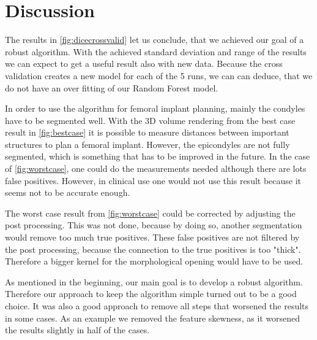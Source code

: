 \section{Discussion}
The results in \autoref{fig:dicecrossvalid} let us conclude, that we achieved our goal of a robust algorithm. With the achieved standard deviation and range of the results we can expect to get a useful result also with new data. Because the cross validation creates a new model for each of the 5 runs, we can can deduce, that we do not have an over fitting of our Random Forest model. 

In order to use the algorithm for femoral implant planning, mainly the condyles have to be segmented well. With the 3D volume rendering from the best case result in \autoref{fig:bestcase} it is possible to measure distances between important structures to plan a femoral implant. However, the epicondyles are not fully segmented, which is something that has to be improved in the future. In the case of \autoref{fig:worstcase}, one could do the measurements needed although there are lots false positives. However, in clinical use one would not use this result because it seems not to be accurate enough.

The worst case result from \autoref{fig:worstcase} could be corrected by adjusting the post processing. This was not done, because by doing so, another segmentation would remove too much true positives. These false positives are not filtered by the post processing, because the connection to the true positives is too "thick". Therefore a bigger kernel for the morphological opening would have to be used.

As mentioned in the beginning, our main goal is to develop a robust algorithm. Therefore our approach to keep the algorithm simple turned out to be a good choice. It was also a good approach to remove all steps that worsened the results in some cases. As an example we removed the feature skewness, as it worsened the results slightly in half of the cases. 